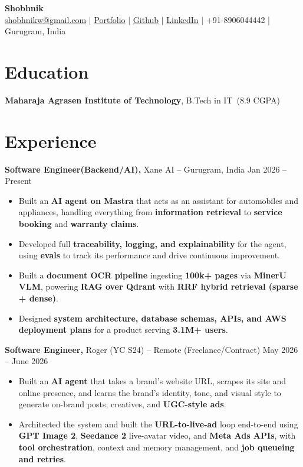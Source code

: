 \documentclass[10pt,a4paper]{article}
\newcommand{\resumeheader}[6]{%
    {\centering
        {\Large \textbf{#1}}\\[4pt]
        \href{mailto:#2}{#2} $|$ 
        \href{#3}{Portfolio} $|$ 
        \href{#4}{Github} $|$ 
        \href{#5}{LinkedIn} $|$ 
        #6\par}
}
\newcommand{\education}[4]{%
    \textbf{#1}, #2\ (#3) \hfill #4
}
\newcommand{\experience}[4]{%
    \textbf{#1,} #2 -- #3 \hfill #4
}
\begin{document}
\resumeheader{Shobhnik}
{shobhnikw@gmail.com}
{https://shobhnik.site}
{https://github.com/shobhnik13}
{https://www.linkedin.com/in/shobhnik13/}
{+91-8906044442 | Gurugram, India}

\section{Education}
\education{Maharaja Agrasen Institute of Technology}{B.Tech in IT}{8.9 CGPA}{}

\section{Experience}

\experience{Software Engineer(Backend/AI)}{Xane AI}{Gurugram, India}{Jan 2026 -- Present}
\begin{itemize}[leftmargin=20pt]

\item Built an \textbf{AI agent on Mastra} that acts as an assistant for automobiles and appliances, handling everything from \textbf{information retrieval} to \textbf{service booking} and \textbf{warranty claims}.

\item Developed full \textbf{traceability, logging, and explainability} for the agent, using \textbf{evals} to track its performance and drive continuous improvement.

\item Built a \textbf{document OCR pipeline} ingesting \textbf{100k+ pages} via \textbf{MinerU VLM}, powering \textbf{RAG over Qdrant} with \textbf{RRF hybrid retrieval (sparse + dense)}.

\item Designed \textbf{system architecture, database schemas, APIs, and AWS deployment plans} for a product serving \textbf{3.1M+ users}.
\end{itemize}


\experience{Software Engineer}{Roger (YC S24) }{Remote (Freelance/Contract)}{May 2026 -- June 2026}
\begin{itemize}[leftmargin=20pt]
\item Built an \textbf{AI agent} that takes a brand's website URL, scrapes its site and online presence, and learns the brand's identity, tone, and visual style to generate on-brand posts, creatives, and \textbf{UGC-style ads}.


\item Architected the system and built the \textbf{URL-to-live-ad} loop end-to-end using \textbf{GPT Image 2}, \textbf{Seedance 2} live-avatar video, and \textbf{Meta Ads APIs}, with \textbf{tool orchestration}, context and memory management, and \textbf{job queueing and retries}.
\end{itemize}
\end{document}
